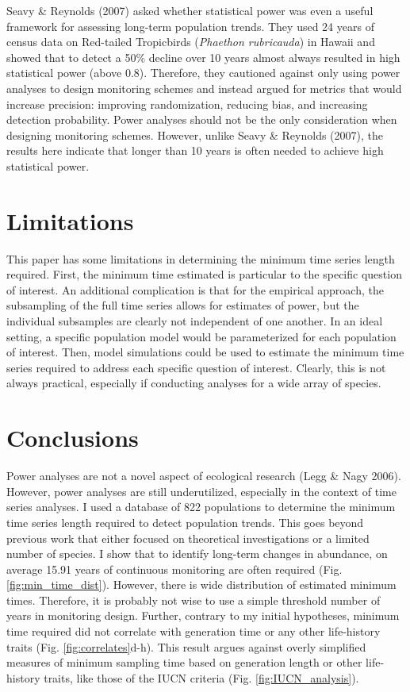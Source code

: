 \documentclass[12pt,]{article}
\begin{document}
Seavy \& Reynolds (2007) asked whether statistical power was even a
useful framework for assessing long-term population trends. They used 24
years of census data on Red-tailed Tropicbirds
(\emph{Phaethon rubricauda}) in Hawaii and showed that to detect a 50\%
decline over 10 years almost always resulted in high statistical power
(above 0.8). Therefore, they cautioned against only using power analyses
to design monitoring schemes and instead argued for metrics that would
increase precision: improving randomization, reducing bias, and
increasing detection probability. Power analyses should not be the only
consideration when designing monitoring schemes. However, unlike Seavy
\& Reynolds (2007), the results here indicate that longer than 10 years
is often needed to achieve high statistical power.

\section{Limitations}\label{limitations}

This paper has some limitations in determining the minimum time series
length required. First, the minimum time estimated is particular to the
specific question of interest. An additional complication is that for
the empirical approach, the subsampling of the full time series allows
for estimates of power, but the individual subsamples are clearly not
independent of one another. In an ideal setting, a specific population
model would be parameterized for each population of interest. Then,
model simulations could be used to estimate the minimum time series
required to address each specific question of interest. Clearly, this is
not always practical, especially if conducting analyses for a wide array
of species.

\section{Conclusions}\label{conclusions}

Power analyses are not a novel aspect of ecological research (Legg \&
Nagy 2006). However, power analyses are still underutilized, especially
in the context of time series analyses. I used a database of 822
populations to determine the minimum time series length required to
detect population trends. This goes beyond previous work that either
focused on theoretical investigations or a limited number of species. I
show that to identify long-term changes in abundance, on average 15.91
years of continuous monitoring are often required (Fig.
\ref{fig:min_time_dist}). However, there is wide distribution of
estimated minimum times. Therefore, it is probably not wise to use a
simple threshold number of years in monitoring design. Further, contrary
to my initial hypotheses, minimum time required did not correlate with
generation time or any other life-history traits (Fig.
\ref{fig:correlates}d-h). This result argues against overly simplified
measures of minimum sampling time based on generation length or other
life-history traits, like those of the IUCN criteria (Fig.
\ref{fig:IUCN_analysis}).
\end{document}
